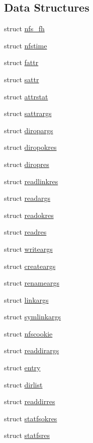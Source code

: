 \subsection*{Data Structures}
\begin{DoxyCompactItemize}
\item 
struct \mbox{\hyperlink{structnfs__fh}{nfs\+\_\+fh}}
\item 
struct \mbox{\hyperlink{structnfstime}{nfstime}}
\item 
struct \mbox{\hyperlink{structfattr}{fattr}}
\item 
struct \mbox{\hyperlink{structsattr}{sattr}}
\item 
struct \mbox{\hyperlink{structattrstat}{attrstat}}
\item 
struct \mbox{\hyperlink{structsattrargs}{sattrargs}}
\item 
struct \mbox{\hyperlink{structdiropargs}{diropargs}}
\item 
struct \mbox{\hyperlink{structdiropokres}{diropokres}}
\item 
struct \mbox{\hyperlink{structdiropres}{diropres}}
\item 
struct \mbox{\hyperlink{structreadlinkres}{readlinkres}}
\item 
struct \mbox{\hyperlink{structreadargs}{readargs}}
\item 
struct \mbox{\hyperlink{structreadokres}{readokres}}
\item 
struct \mbox{\hyperlink{structreadres}{readres}}
\item 
struct \mbox{\hyperlink{structwriteargs}{writeargs}}
\item 
struct \mbox{\hyperlink{structcreateargs}{createargs}}
\item 
struct \mbox{\hyperlink{structrenameargs}{renameargs}}
\item 
struct \mbox{\hyperlink{structlinkargs}{linkargs}}
\item 
struct \mbox{\hyperlink{structsymlinkargs}{symlinkargs}}
\item 
struct \mbox{\hyperlink{structnfscookie}{nfscookie}}
\item 
struct \mbox{\hyperlink{structreaddirargs}{readdirargs}}
\item 
struct \mbox{\hyperlink{structentry}{entry}}
\item 
struct \mbox{\hyperlink{structdirlist}{dirlist}}
\item 
struct \mbox{\hyperlink{structreaddirres}{readdirres}}
\item 
struct \mbox{\hyperlink{structstatfsokres}{statfsokres}}
\item 
struct \mbox{\hyperlink{structstatfsres}{statfsres}}
\end{DoxyCompactItemize}
